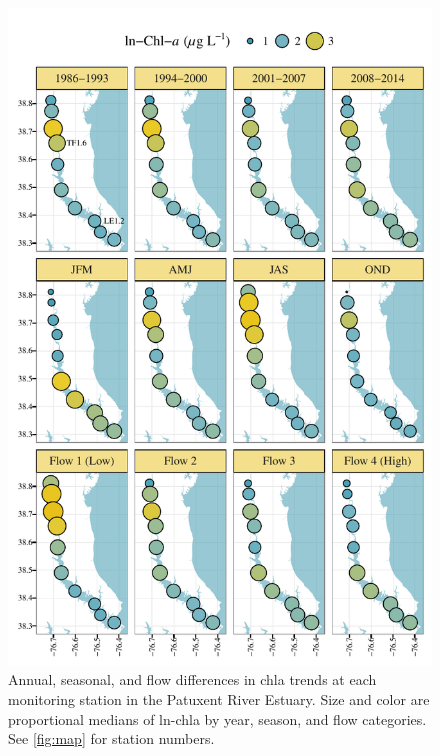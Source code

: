 \documentclass{svjour3}\usepackage[]{graphicx}\usepackage[]{color}
\makeatletter
\def\maxwidth{ %
  \ifdim\Gin@nat@width>\linewidth
    \linewidth
  \else
    \Gin@nat@width
  \fi
}
\makeatother
\begin{document}
\begin{figure}[!ht]

{\centering \includegraphics[width=\maxwidth]{figs/chlyrmofl-1} 

}

\caption{Annual, seasonal, and flow differences in \ac{chla} trends at each monitoring station in the Patuxent River Estuary.  Size and color are proportional medians of ln-\ac{chla} by year, season, and flow categories. See \cref{fig:map} for station numbers.}\label{fig:chlyrmofl}
\end{figure}



\end{document}
